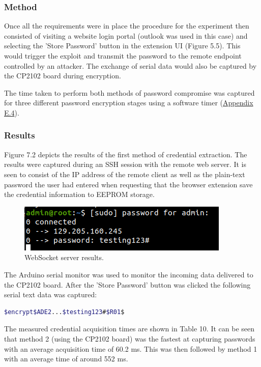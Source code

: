 \subsubsection{Method}
Once all the requirements were in place the procedure for the experiment then consisted of visiting a website login portal (outlook was used in this case) and selecting the 'Store Password' button in the extension UI (Figure 5.5). This would trigger the exploit and transmit the password to the remote endpoint controlled by an attacker. The exchange of serial data would also be captured by the CP2102 board during encryption. 

The time taken to perform both methods of password compromise was captured for three different password encryption stages using a software timer (\hyperref[sec:timerp]{Appendix E.4}).
\subsubsection{Results}
Figure 7.2 depicts the results of the first method of credential extraction. The results were captured during an SSH session with the remote web server. It is seen to consist of the IP address of the remote client as well as the plain-text password the user had entered when requesting that the browser extension save the credential information to EEPROM storage. 

\begin{figure}[H]
\centering
\includegraphics[width=0.6\columnwidth]{Figures/Fig_28.png}
\caption{WebSocket server results.}
\label{fig:gantt}
\end{figure}

The Arduino serial monitor was used to monitor the incoming data delivered to the CP2102 board. After the 'Store Password' button was clicked the following serial text data was captured:

\begin{lstlisting}[language=bash, frame=none]
$encrypt$ADE2...$testing123#$R01$
\end{lstlisting}

The measured credential acquisition times are shown in Table 10. It can be seen that method 2 (using the CP2102 board) was the fastest at capturing passwords with an average acquisition time of 60.2 ms. This was then followed by method 1 with an average time of around 552 ms.

